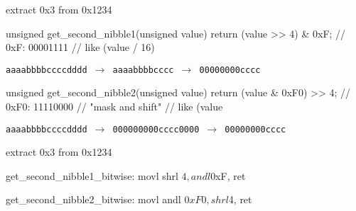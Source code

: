 
\begin{frame}[fragile,label=extractOp3]{extract 0x3 from 0x1234}
\begin{ccodeNL}
unsigned get_second_nibble1(unsigned value) {
    return (value >> 4) & 0xF; // 0xF: 00001111
    // like (value / 16) %
}
\end{ccodeNL}
{\small\tt aaaabbbbccccdddd $\rightarrow$ aaaabbbbcccc $\rightarrow$ 00000000cccc}
\vspace{1.5cm}
\begin{ccodeNL}
unsigned get_second_nibble2(unsigned value) {
    return (value & 0xF0) >> 4; // 0xF0: 11110000
         //    "mask and shift"
    // like (value %
}
\end{ccodeNL}
{\small\tt aaaabbbbccccdddd $\rightarrow$ 000000000cccc0000 $\rightarrow$ 00000000cccc}
\end{frame}

\begin{frame}[fragile,label=extractOp4]{extract 0x3 from 0x1234}
\begin{asmcodeNL}
get_second_nibble1_bitwise:
    movl %
    shrl $4, %
    andl $0xF, %
    ret

get_second_nibble2_bitwise:
    movl %
    andl $0xF0, %
    shrl $4, %
    ret
\end{asmcodeNL}
\end{frame}

